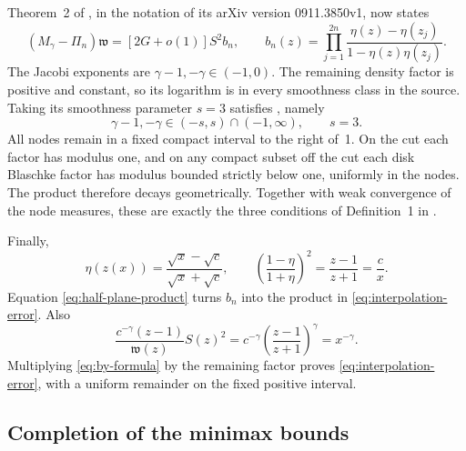 \documentclass[11pt]{article}
\begin{document}
Theorem~2 of \cite{BY}, in the notation of its arXiv version
0911.3850v1, now states
\begin{equation}\label{eq:by-formula}
 (M_\gamma-\Pi_n)\mathfrak w
           =[2G+o(1)]S^2 b_n,\qquad
 b_n(z)=\prod_{j=1}^{2n}
          \frac{\eta(z)-\eta(z_j)}{1-\eta(z)\eta(z_j)}.
\end{equation}
The Jacobi exponents are $\gamma-1,-\gamma\in(-1,0)$.
The remaining density factor is positive and constant, so its logarithm
is in every smoothness class in the source. Taking its smoothness
parameter $s=3$ satisfies \cite[equation~(2.9)]{BY}, namely
\[
 \gamma-1,-\gamma\in(-s,s)\cap(-1,\infty),\qquad s=3.
\]
All nodes remain in a fixed compact interval to the right of~1.
On the cut each factor has modulus one, and on any compact subset off
the cut each disk Blaschke factor has modulus bounded strictly below
one, uniformly in the nodes. The product therefore decays geometrically.
Together with weak convergence of the node measures, these are exactly
the three conditions of Definition~1 in \cite{BY}.

Finally,
\[
 \eta(z(x))=\frac{\sqrt x-\sqrt c}{\sqrt x+\sqrt c},\qquad
 \left(\frac{1-\eta}{1+\eta}\right)^2
       =\frac{z-1}{z+1}=\frac c x.
\]
Equation \eqref{eq:half-plane-product} turns $b_n$ into the product in
\eqref{eq:interpolation-error}. Also
\[
 \frac{c^{-\gamma}(z-1)}{\mathfrak w(z)}S(z)^2
       =c^{-\gamma}\left(\frac{z-1}{z+1}\right)^{\gamma}
       =x^{-\gamma}.
\]
Multiplying \eqref{eq:by-formula} by the remaining factor proves
\eqref{eq:interpolation-error}, with a uniform remainder on the fixed
positive interval.

\subsection{Completion of the minimax bounds}
\end{document}
